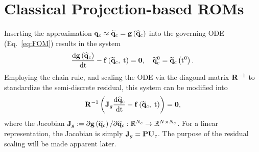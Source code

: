 \section{Classical Projection-based ROMs}\label{sec:classicROMs}

Inserting the approximation $\mathbf{q}_{c} \approx \mathbf{\widetilde{q}}_{c} = \mathbf{g} \left(\mathbf{\widehat{q}}_{c}\right)$ into the governing ODE (Eq.~\ref{eq:FOM}) results in the system
%
\begin{equation}\label{eq:romFullODE}
    \frac{\text{d} \mathbf{g} \left(\mathbf{\widehat{q}}_{c}\right)}{\text{d} \text{t}} - \mathbf{f} \left(\mathbf{\widetilde{q}}_{c}, \; \text{t}\right) = \mathbf{0}, \quad \mathbf{\widetilde{q}}_{c}^0 = \mathbf{\widetilde{q}}_{c} \left(\text{t}^0\right).
\end{equation}
%
Employing the chain rule, and scaling the ODE via the diagonal matrix $\resScaleInv$ to standardize the semi-discrete residual, this system can be modified into
%
\begin{equation}\label{eq:romFullODEMod}
    \resScaleInv \left( \jacobDecode \ode{\consVecCoef}{\timeVar} - \rhsFunc{\consVecRom, \; \timeVar} \right) = \zeroVec,
\end{equation}
%
where the Jacobian $\mathbf{J}_{g} := \partial \mathbf{g} \left(\mathbf{\widehat{q}}_{c}\right) / \partial \mathbf{\widehat{q}}_{c}: \mathbb{R}^{N_c} \rightarrow \mathbb{R}^{N \times N_c}$. For a linear representation, the Jacobian is simply $\jacobDecode = \consScale \consTrial$. The purpose of the residual scaling will be made apparent later.


